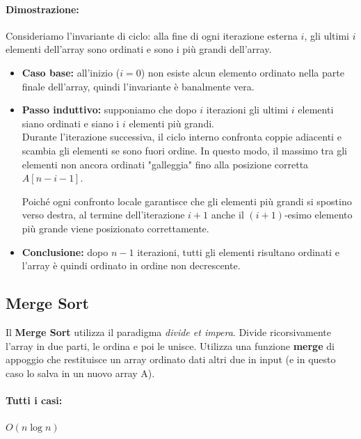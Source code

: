 \documentclass[a4paper,12pt]{article}
\begin{document}
\paragraph{Dimostrazione:}
Consideriamo l'invariante di ciclo: alla fine di ogni iterazione esterna $i$, gli ultimi $i$ elementi dell'array sono ordinati e sono i più grandi dell'array.

\begin{itemize}
    \item \textbf{Caso base:} all'inizio ($i = 0$) non esiste alcun elemento ordinato nella parte finale dell'array, quindi l'invariante è banalmente vera.
    
    \item \textbf{Passo induttivo:} supponiamo che dopo $i$ iterazioni gli ultimi $i$ elementi siano ordinati e siano i $i$ elementi più grandi.\\
    Durante l'iterazione successiva, il ciclo interno confronta coppie adiacenti e scambia gli elementi se sono fuori ordine. In questo modo, il massimo tra gli elementi non ancora ordinati "galleggia" fino alla posizione corretta $A[n - i - 1]$.
    
    Poiché ogni confronto locale garantisce che gli elementi più grandi si spostino verso destra, al termine dell'iterazione $i+1$ anche il $(i+1)$-esimo elemento più grande viene posizionato correttamente.
    
    \item \textbf{Conclusione:} dopo $n-1$ iterazioni, tutti gli elementi risultano ordinati e l'array è quindi ordinato in ordine non decrescente.
\end{itemize}

\subsection{Merge Sort}
Il \textbf{Merge Sort} utilizza il paradigma \textit{divide et impera}. Divide ricorsivamente l’array in due parti, le ordina e poi le unisce. Utilizza una funzione \textbf{merge} di appoggio che restituisce un array ordinato dati altri due in input (e in questo caso lo salva in un nuovo array A).

\paragraph{Tutti i casi:} $O(n \log n)$
\end{document}
